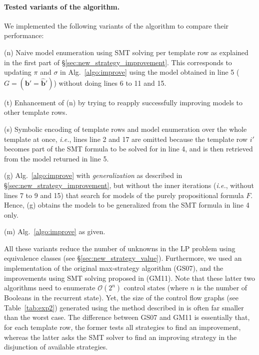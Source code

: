 \documentclass{llncs}
\newcommand{\instance}[1]{\hat{#1}}
\newcommand{\ie}{\textit{i.e.}}
\renewcommand{\vec}[1]{{\boldsymbol #1}}
\begin{document}
\paragraph{Tested variants of the algorithm.}
We implemented the following variants of the algorithm to compare
their performance:
\begin{compactitem} 
\item[(n)] Naive model enumeration using SMT solving per template row
  as explained in the first part of \S\ref{sec:new_strategy_improvement}. This
  corresponds to updating $\pi$ and $\sigma$ in
  Alg.~\ref{algo:improve} using the model obtained in line 5
  ($G=(\vec{b}'=\instance{\vec{b}}')$) without doing lines 6 to 11 and 15.
\item[(t)] Enhancement of (n) by trying to reapply successfully improving models to other template rows.
\item[(s)] Symbolic encoding of template rows and model enumeration
  over the whole template at once, \ie, lines line 2 and 17 are omitted
  because the template row $i'$ becomes part of the SMT formula to be
  solved for in line 4, and is then retrieved from the model returned in line 5.
\item[(g)] Alg.~\ref{algo:improve} with \emph{generalization} as
  described in \S\ref{sec:new_strategy_improvement}, but without the
  inner iterations (\ie, without lines 7 to 9 and 15) that search for
  models of the purely propositional formula $F$.
  Hence, (g) obtains the models to be generalized from the SMT formula
  in line 4 only.
\item[(m)] Alg.~\ref{algo:improve} as given.
\end{compactitem}
All these variants reduce the number of unknowns in the LP problem
using equivalence classes (see \S\ref{sec:new_strategy_value}).
Furthermore, we used an implementation of the original max-strategy
algorithm \cite{GS07} (GS07), and the improvements using
SMT solving proposed in \cite{GM11} (GM11).  Note that these latter
two algorithms need to enumerate $\mathcal{O}(2^n)$ control states
(where $n$ is the number of Booleans in the recurrent state).
Yet, the size of the control flow graphs (see Table~\ref{tab:exp2})
generated using the method described in \cite[\S7.3]{Sch12}
is often far smaller than the worst case.
The difference between GS07 and GM11 is essentially that, for each
template row, the former tests all strategies to find an improvement,
whereas the latter asks the SMT solver to find an improving strategy
in the disjunction of available strategies.
\end{document}
